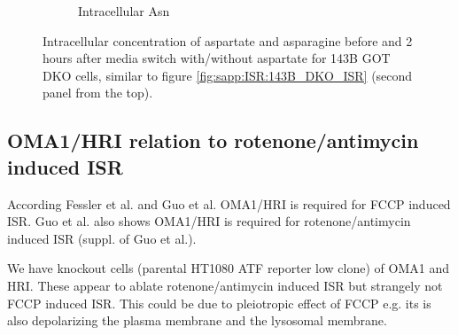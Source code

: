 \begin{figure}[!ht]
\begin{subfigure}[b]{0.35\textwidth}
         \caption{Intracellular Asn}
         \label{fig:sapp:ISR:143B_GOT_DKO_ISR_Asn_conc}
     \end{subfigure}
     \hfill
        \caption[Intracellular Asp/Asn at ISR in GOT DKO]{
        Intracellular concentration of aspartate and asparagine before and 2 hours after media switch with/without aspartate for 143B GOT DKO cells, similar to figure \ref{fig:sapp:ISR:143B_DKO_ISR} (second panel from the top).
        }
        \label{fig:sapp:ISR:143B_GOT_DKO_ISR_conc}
\end{figure}





\FloatBarrier
\subsection{OMA1/HRI relation to rotenone/antimycin induced ISR}
According Fessler et al. and Guo et al. \cite{Fessler2020-zk, Guo2020-ia} OMA1/HRI is required for FCCP induced ISR.
Guo et al. also shows OMA1/HRI is required for rotenone/antimycin induced ISR (suppl. of Guo et al.).

We have knockout cells (parental HT1080 ATF reporter low clone) of OMA1 and HRI.
These appear to ablate rotenone/antimycin induced ISR but strangely not FCCP induced ISR.
This could be due to pleiotropic effect of FCCP e.g. its is also depolarizing the plasma membrane and the lysosomal membrane.

